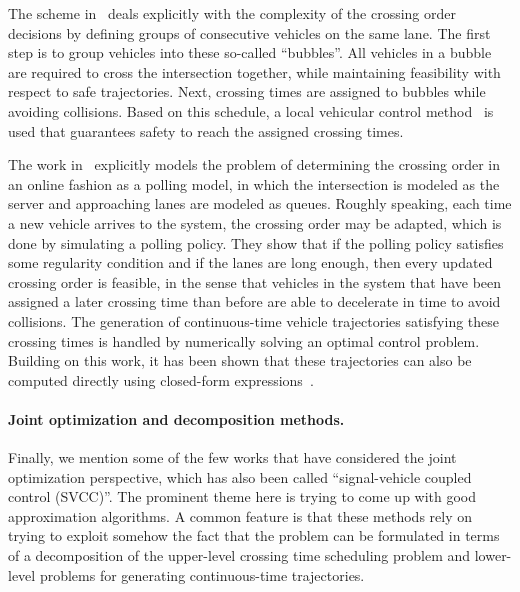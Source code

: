 \documentclass[a4paper]{report}
\theoremstyle{definition}
\theoremstyle{plain}
\begin{document}
The scheme
in~\cite{tallapragadaHierarchicaldistributedOptimizedCoordination2017} deals
explicitly with the complexity of the crossing order decisions by defining
groups of consecutive vehicles on the same lane. The first step is to group
vehicles into these so-called ``bubbles''. All vehicles in a bubble are required
to cross the intersection together, while maintaining feasibility with respect
to safe trajectories. Next, crossing times are assigned to bubbles while
avoiding collisions. Based on this schedule, a local vehicular control
method~\cite{tallapragadaDistributedControlVehicle2017} is used that guarantees
safety to reach the assigned crossing times.

The work in~\cite{miculescuPollingsystemsbasedAutonomousVehicle2016} explicitly
models the problem of determining the crossing order in an online fashion as a
polling model, in which the intersection is modeled as the server and
approaching lanes are modeled as queues.
%
Roughly speaking, each time a new vehicle arrives to the system, the crossing
order may be adapted, which is done by simulating a polling policy.
%
They show that if the polling policy satisfies some regularity condition and if
the lanes are long enough, then every updated crossing order is feasible, in the
sense that vehicles in the system that have been assigned a later crossing time
than before are able to decelerate in time to avoid collisions.
%
The generation of continuous-time vehicle trajectories satisfying these crossing
times is handled by numerically solving an optimal control problem.
Building on this work, it has been shown that these trajectories can also be
computed directly using closed-form
expressions~\cite{timmermanPlatoonFormingAlgorithms2021}.

\paragraph{Joint optimization and decomposition methods.}

Finally, we mention some of the few works that have considered the joint
optimization perspective, which has also been called ``signal-vehicle coupled
control (SVCC)''. The prominent theme here is trying to come up with good
approximation algorithms. A common feature is that these methods rely on trying
to exploit somehow the fact that the problem can be formulated in terms of a
decomposition of the upper-level crossing time scheduling problem and
lower-level problems for generating continuous-time trajectories.
\end{document}
